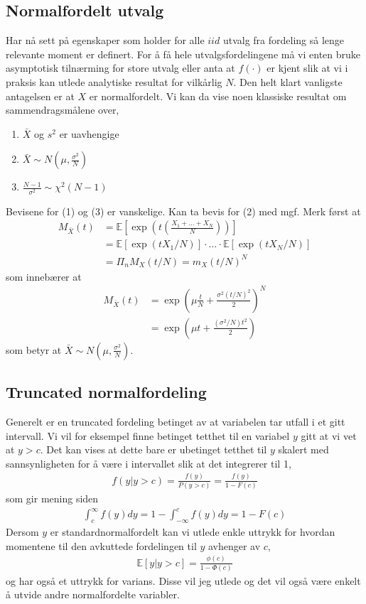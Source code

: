 \subsection{Normalfordelt utvalg}
Har nå sett på egenskaper som holder for alle $iid$ utvalg fra fordeling så lenge relevante moment er definert. For å få hele utvalgsfordelingene må vi enten bruke asymptotisk tilnærming for store utvalg eller anta at $f(\cdot)$ er kjent slik at vi i praksis kan utlede analytiske resultat for vilkårlig $N$. Den helt klart vanligste antagelsen er at $X$ er normalfordelt. Vi kan da vise noen klassiske resultat om sammendragsmålene over,
\begin{enumerate}
\item $\bar{X}$ og $s^2$ er uavhengige
\item $\bar{X} \sim N(\mu, \frac{\sigma^2}{N})$
\item $\frac{N-1}{\sigma^2}\sim \chi^2(N-1)$
\end{enumerate}
Bevisene for (1) og (3) er vanskelige. Kan ta bevis for (2) med mgf. Merk først at
\begin{align}
M_{\bar{X}}(t) &= \mathbb{E}\left[\exp\left(t\left(\frac{X_1+\dots+X_N}{N}\right)\right)\right] \\
&=\mathbb{E}[\exp(tX_1/N)]\cdot\ldots\cdot\mathbb{E}[\exp(tX_N/N)] \\
&= \Pi_n M_X(t/N) = m_X(t/N)^N 
\end{align}
som innebærer at 
\begin{align}
M_{\bar{X}}(t) &= \exp\left(\mu\frac{t}{N}+\frac{\sigma^2(t/N)^2}{2}\right)^N \\
&= \exp\left(\mu t + \frac{(\sigma^2/N)t^2}{2}\right)
\end{align}
som betyr at $\bar{X} \sim N(\mu, \frac{\sigma^2}{N})$.

\subsection{Truncated normalfordeling}
Generelt er en truncated fordeling betinget av at variabelen tar utfall i et gitt intervall. Vi vil for eksempel finne betinget tetthet til en variabel $y$ gitt at vi vet at $y>c$. Det kan vises at dette bare er ubetinget tetthet til $y$ skalert med sannsynligheten for å være i intervallet slik at det integrerer til 1,
\begin{align}
f(y|y>c) = \frac{f(y)}{P(y>c)} = \frac{f(y)}{1-F(c)}
\end{align}
som gir mening siden 
\begin{align}
\int_c^{\infty}f(y)dy = 1- \int_{-\infty}^{c}f(y)dy = 1-F(c)
\end{align}
Dersom $y$ er standardnormalfordelt kan vi utlede enkle uttrykk for hvordan momentene til den avkuttede fordelingen til $y$ avhenger av $c$,
\begin{align}
\mathbb{E}[y|y>c]=\frac{\phi(c)}{1-\Phi(c)}
\end{align}
og har også et uttrykk for varians. Disse vil jeg utlede og det vil også være enkelt å utvide andre normalfordelte variabler.
